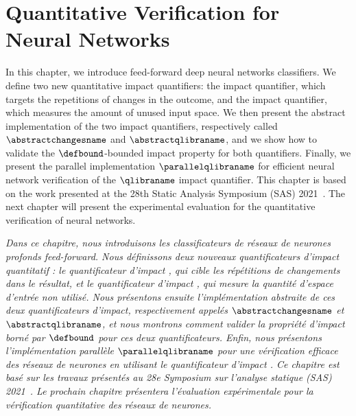\setchapterpreamble[u]{\margintoc}


\chapter{Quantitative Verification for Neural Networks}

\marginemptybox{9.6cm}

In this chapter, we introduce feed-forward deep neural networks classifiers.
We define two new quantitative impact quantifiers: the \changesname{} impact quantifier, which targets the repetitions of changes in the outcome, and the \qlibraname{} impact quantifier, which measures the amount of unused input space. We then present the abstract implementation of the two impact quantifiers, respectively called $\abstractchangesname$ and $\abstractqlibraname$, and we show how to validate the $\defbound$-bounded impact property for both quantifiers. Finally, we present the parallel implementation $\parallelqlibraname$ for efficient neural network verification of the $\qlibraname$ impact quantifier.
This chapter is based on the work presented at the 28th Static Analysis Symposium (SAS) 2021~.
The next chapter will present the experimental evaluation for the quantitative verification of neural networks.


\frenchdiv

\emph{Dans ce chapitre, nous introduisons les classificateurs de réseaux de neurones profonds feed-forward. Nous définissons deux nouveaux quantificateurs d'impact quantitatif : le quantificateur d'impact \changesname{}, qui cible les répétitions de changements dans le résultat, et le quantificateur d'impact \qlibraname{}, qui mesure la quantité d'espace d'entrée non utilisé. Nous présentons ensuite l'implémentation abstraite de ces deux quantificateurs d'impact, respectivement appelés $\abstractchangesname$ et $\abstractqlibraname$, et nous montrons comment valider la propriété d'impact borné par $\defbound$ pour ces deux quantificateurs. Enfin, nous présentons l'implémentation parallèle $\parallelqlibraname$ pour une vérification efficace des réseaux de neurones en utilisant le quantificateur d'impact \qlibraname{}. Ce chapitre est basé sur les travaux présentés au 28e Symposium sur l'analyse statique (SAS) 2021~\cite{Mazzucato2021}. Le prochain chapitre présentera l'évaluation expérimentale pour la vérification quantitative des réseaux de neurones.}

% 
% 
% 
% 
% 

